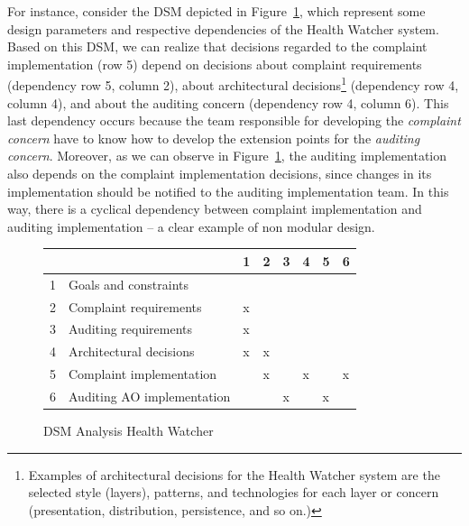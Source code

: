 For instance, consider the DSM depicted in Figure~\ref{dsm:hw01}, which represent
some design parameters and respective dependencies of the Health Watcher
system. Based on this DSM, we can realize that decisions regarded to the
complaint implementation (row 5) depend on decisions about complaint
requirements (dependency row 5, column 2), about architectural
decisions\footnote{Examples of architectural decisions for the Health Watcher
system are the selected style (layers), patterns, and technologies for each
layer or concern (presentation, distribution, persistence, and so on.)}
(dependency row 4, column 4), and about the auditing concern (dependency row 4,
column 6). This last dependency occurs because the team responsible for developing
the \emph{complaint concern} have to know how to develop the extension points for
the \emph{auditing concern}. Moreover, as we can observe in
Figure~\ref{dsm:hw01}, the auditing implementation also depends on the
complaint implementation decisions, since changes in its implementation should
be notified to the auditing implementation team. In this way, there is a
cyclical dependency between complaint implementation and auditing
implementation -- a clear example of non modular design.

\begin{figure}[htb]
\centering
\begin{scriptsize}
\begin{tabular}{|l|l|l|l|l|l|l|l|} \hline
  &                             & 1     & 2     & 3     & 4     & 5     & 6 \\ \hline
1 & Goals and constraints       &       &       &       &       &       &   \\ \hline
2 & Complaint requirements      & x     &       &       &       &       &   \\ \hline
3 & Auditing requirements       & x     &       &       &       &       &   \\ \hline
4 & Architectural decisions     & x     & x     &       &       &       &   \\ \hline
5 & Complaint implementation    &       & x     &       & x     &       & x \\ \hline
6 & Auditing AO implementation  &       &       & x     &       & x     &   \\  \hline
\end{tabular}
\end{scriptsize}
\caption{DSM Analysis Health Watcher}
\label{dsm:hw01}
\end{figure}


